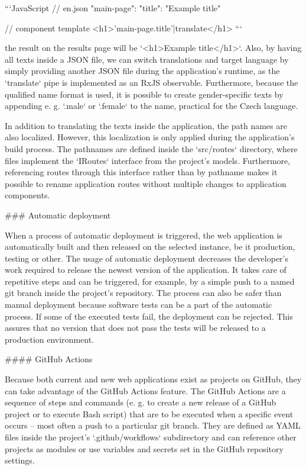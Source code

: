 \documentclass[
  digital, %
  oneside, %
  lof,     %
  nolot,     %
]{fithesis4}
\begin{document}
{```JavaScript
// en.json
{
	"main-page": {
		"title": "Example title"
	}
}

// component template
<h1>{{'main-page.title'|translate}}</h1>
```

the result on the results page will be `<h1>Example title</h1>`. Also, by having all texts inside a \acrshort{JSON} file, we can switch translations and target language by simply providing another \acrshort{JSON} file during the application's runtime, as the `translate` pipe is implemented as an RxJS observable. Furthermore, because the qualified name format is used, it is possible to create gender-specific texts by appending e. g. `.male` or `.female` to the name, practical for the Czech language.

In addition to translating the texts inside the application, the path names are also localized. However, this localization is only applied during the application's build process. The pathnames are defined inside the `src/routes` directory, where files implement the `IRoutes` interface from the project's models. Furthermore, referencing routes through this interface rather than by pathname makes it possible to rename application routes without multiple changes to application components.

### Automatic deployment
\label{chap:autodeploy}

When a process of automatic deployment is triggered, the web application is automatically built and then released on the selected instance, be it production, testing or other. The usage of automatic deployment decreases the developer's work required to release the newest version of the application. It takes care of repetitive steps and can be triggered, for example, by a simple push to a named git branch inside the project's repository. The process can also be safer than manual deployment because software tests can be a part of the automatic process. If some of the executed tests fail, the deployment can be rejected. This assures that no version that does not pass the tests will be released to a production environment.

#### GitHub Actions

Because both current and new web applications exist as projects on GitHub, they can take advantage of the GitHub Actions feature. The GitHub Actions are a sequence of steps and commands (e. g. to create a new release of a GitHub project or to execute Bash script) that are to be executed when a specific event occurs -- most often a push to a particular git branch. They are defined as \acrshort{YAML} files inside the project's `.github/workflows` subdirectory and can reference other projects as modules or use variables and secrets set in the GitHub repository settings.

}
\end{document}
